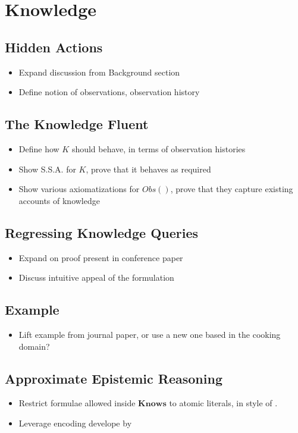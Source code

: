 
\chapter{Knowledge}

\label{ch:knowledge} %



\section{Hidden Actions}

\begin{itemize}
\item Expand discussion from Background section 
\item Define notion of observations, observation history 
\end{itemize}

\section{The Knowledge Fluent}

\begin{itemize}
\item Define how $K$ should behave, in terms of observation histories 
\item Show S.S.A. for $K$, prove that it behaves as required 
\item Show various axiomatizations for $Obs()$, prove that they capture
existing accounts of knowledge 
\end{itemize}

\section{Regressing Knowledge Queries}

\begin{itemize}
\item Expand on proof present in conference paper 
\item Discuss intuitive appeal of the formulation 
\end{itemize}

\section{Example}

\begin{itemize}
\item Lift example from journal paper, or use a new one based in the cooking
domain?
\end{itemize}

\section{Approximate Epistemic Reasoning}

\begin{itemize}
\item Restrict formulae allowed inside $\mathbf{Knows}$ to atomic literals, in
style of \cite{demolombe00tractable_sc_belief}.
\item Leverage encoding develope by \cite{petrick02knowledge_equivalence}
\end{itemize}


